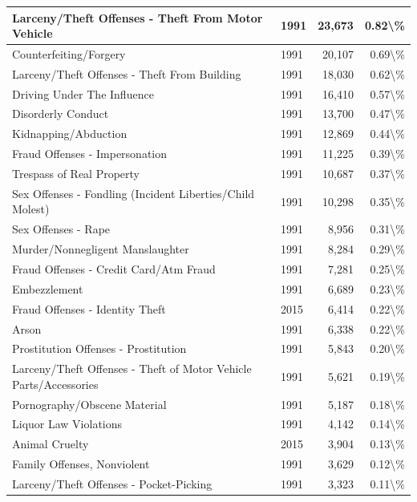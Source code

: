 \documentclass[
]{krantz}
\begin{document}
\begin{longtable}[t]{l|l|r|r}
\hline
Larceny/Theft Offenses - Theft From Motor Vehicle & 1991 & 23,673 & 0.82\textbackslash{}\%\\
\hline
Counterfeiting/Forgery & 1991 & 20,107 & 0.69\textbackslash{}\%\\
\hline
Larceny/Theft Offenses - Theft From Building & 1991 & 18,030 & 0.62\textbackslash{}\%\\
\hline
Driving Under The Influence & 1991 & 16,410 & 0.57\textbackslash{}\%\\
\hline
Disorderly Conduct & 1991 & 13,700 & 0.47\textbackslash{}\%\\
\hline
Kidnapping/Abduction & 1991 & 12,869 & 0.44\textbackslash{}\%\\
\hline
Fraud Offenses - Impersonation & 1991 & 11,225 & 0.39\textbackslash{}\%\\
\hline
Trespass of Real Property & 1991 & 10,687 & 0.37\textbackslash{}\%\\
\hline
Sex Offenses - Fondling (Incident Liberties/Child Molest) & 1991 & 10,298 & 0.35\textbackslash{}\%\\
\hline
Sex Offenses - Rape & 1991 & 8,956 & 0.31\textbackslash{}\%\\
\hline
Murder/Nonnegligent Manslaughter & 1991 & 8,284 & 0.29\textbackslash{}\%\\
\hline
Fraud Offenses - Credit Card/Atm Fraud & 1991 & 7,281 & 0.25\textbackslash{}\%\\
\hline
Embezzlement & 1991 & 6,689 & 0.23\textbackslash{}\%\\
\hline
Fraud Offenses - Identity Theft & 2015 & 6,414 & 0.22\textbackslash{}\%\\
\hline
Arson & 1991 & 6,338 & 0.22\textbackslash{}\%\\
\hline
Prostitution Offenses - Prostitution & 1991 & 5,843 & 0.20\textbackslash{}\%\\
\hline
Larceny/Theft Offenses - Theft of Motor Vehicle Parts/Accessories & 1991 & 5,621 & 0.19\textbackslash{}\%\\
\hline
Pornography/Obscene Material & 1991 & 5,187 & 0.18\textbackslash{}\%\\
\hline
Liquor Law Violations & 1991 & 4,142 & 0.14\textbackslash{}\%\\
\hline
Animal Cruelty & 2015 & 3,904 & 0.13\textbackslash{}\%\\
\hline
Family Offenses, Nonviolent & 1991 & 3,629 & 0.12\textbackslash{}\%\\
\hline
Larceny/Theft Offenses - Pocket-Picking & 1991 & 3,323 & 0.11\textbackslash{}\%\\

\end{longtable}
\end{document}
